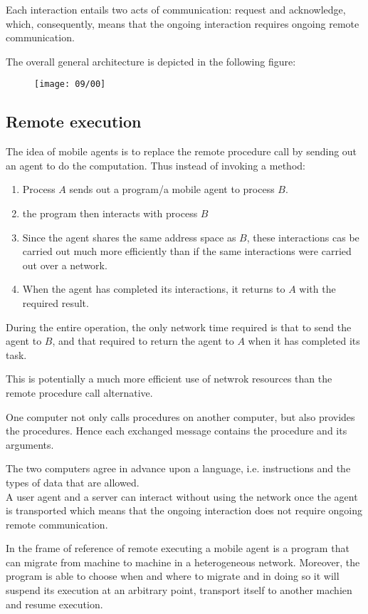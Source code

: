 Each interaction entails two acts of communication: request and acknowledge, which, consequently, means that the ongoing interaction requires ongoing remote communication.

The overall general architecture is depicted in the following figure:

\begin{figure}[!h]
\centering
\texttt{[image: 09/00]}
\end{figure}

\subsection{Remote execution}
The idea of mobile agents is to replace the remote procedure call by sending out an agent to do the computation. Thus instead of invoking a method:
\begin{enumerate}
\item Process $A$ sends out a program/a mobile agent to process $B$.
\item the program then interacts with process $B$
\item Since the agent shares the same address space as $B$, these interactions cas be carried out much more efficiently than if the same interactions were carried out over a network.
\item When the agent has completed its interactions, it returns to $A$ with the required result.
\end{enumerate}

During the entire operation, the only network time required is that to send the agent to $B$, and that required to return the agent to $A$ when it has completed its task.

This is potentially a much more efficient use of netwrok resources than the remote procedure call alternative.

One computer not only calls procedures on another computer, but also provides the procedures. Hence each exchanged message contains the procedure and its arguments.

The two computers agree in advance upon a language, i.e. instructions and the types of data that are allowed.\\
A user agent and a server can interact without using the network once the agent is transported which means that the ongoing interaction does not require ongoing remote communication.

In the frame of reference of remote executing a mobile agent is a program that can migrate from machine to machine in a heterogeneous network. Moreover, the program is able to choose when and where to migrate and in doing so it will suspend its execution at an arbitrary point, transport itself to another machien and resume execution.

